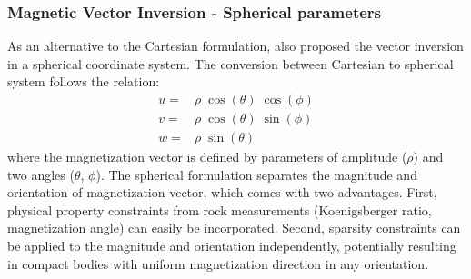 \documentclass[paper]{geophysics}
\begin{document}
\subsubsection{Magnetic Vector Inversion - Spherical parameters}
As an alternative to the Cartesian formulation, \cite{LelievreOldenburg2009} also proposed the vector inversion in a spherical coordinate system.
The conversion between Cartesian to spherical system follows the relation:
\begin{equation}\label{eq:Cart_to_Spherical}
\begin{split}
u = & \rho \; \cos(\theta)\;\cos(\phi) \\
v = & \rho \; \cos(\theta)\;\sin(\phi) \\
w = & \rho \; \sin(\theta)
\end{split}
\end{equation}
where the magnetization vector is defined by parameters of amplitude (${\rho}$) and two angles (${\theta}$, ${\phi}$).
The spherical formulation separates the magnitude and orientation of magnetization vector, which comes with two advantages. First, physical property constraints from rock measurements (Koenigsberger ratio, magnetization angle) can easily be incorporated. Second, sparsity constraints can be applied to the magnitude and orientation independently, potentially resulting in compact bodies with uniform magnetization direction in any orientation.
\end{document}
